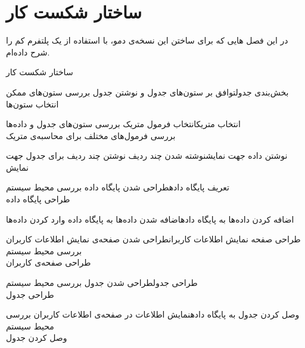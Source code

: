 \chapter{ساختار شکست کار}
در این فصل 
هایی
که برای ساختن این نسخه‌ی دمو، با استفاده از یک پلتفرم کم را شرح داده‌ام.

\begin{wbsbox}{ساختار شکست کار}
\begin{wbssub}{بخش‌بندی جدول}{توافق بر ستون‌های جدول و نوشتن جدول}
\task بررسی ستون‌های ممکن \\
\task انتخاب ستون‌ها
\end{wbssub}

\begin{wbssub}{انتخاب متریک}{انتخاب فرمول متریک}
\task بررسی ستون‌های جدول و داده‌ها\\
\task بررسی فرمول‌های مختلف ‌برای محاسبه‌ی متریک
\end{wbssub}

\begin{wbssub}{نوشتن داده جهت نمایش}{نوشته شدن چند ردیف}
\task نوشتن چند ردیف برای جدول جهت نمایش
\end{wbssub}

\begin{wbssub}{تعریف پایگاه داده}{طراحی شدن پایگاه داده}
\task بررسی محیط سیستم  \\
\task طراحی پایگاه داده
\end{wbssub}

\begin{wbssub}{اضافه کردن داده‌ها به پایگاه داده}{اضافه شدن داده‌ها به پایگاه داده}
\task وارد کردن داده‌ها
\end{wbssub}

\begin{wbssub}{طراحی صفحه نمایش اطلاعات کاربران}{طراحی شدن صفحه‌ی نمایش اطلاعات کاربران}
\task بررسی محیط سیستم  \\
\task طراحی صفحه‌ی کاربران
\end{wbssub}

\begin{wbssub}{طراحی جدول}{طراحی شدن جدول}
\task بررسی محیط سیستم  \\
\task طراحی جدول
\end{wbssub}

\begin{wbssub}{وصل کردن جدول به پایگاه داده}{نمایش اطلاعات در صفحه‌ی اطلاعات کاربران}
\task بررسی محیط سیستم  \\
\task وصل کردن جدول
\end{wbssub}


\end{wbsbox}

